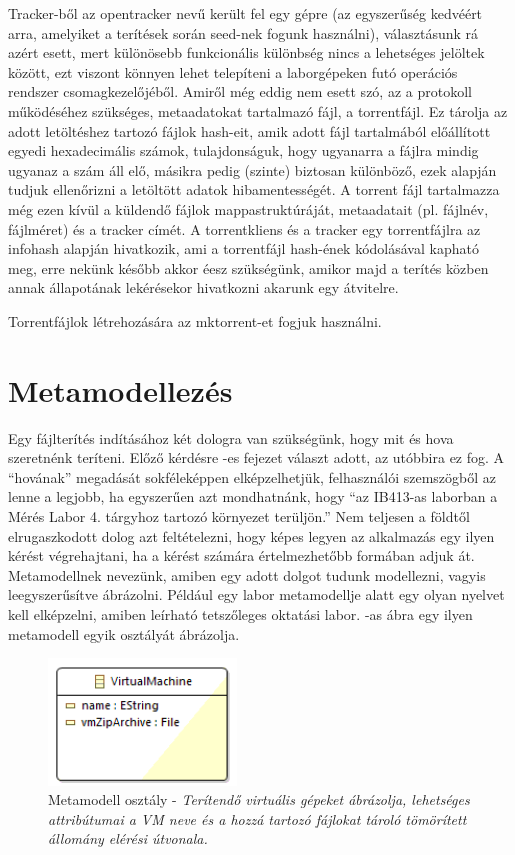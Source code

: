 Tracker-ből az opentracker nevű került fel egy gépre (az egyszerűség kedvéért arra, amelyiket a terítések során seed-nek fogunk használni), választásunk rá azért esett, mert különösebb funkcionális különbség nincs a lehetséges jelöltek között, ezt viszont könnyen lehet telepíteni a laborgépeken futó operációs rendszer csomagkezelőjéből. Amiről még eddig nem esett szó, az a protokoll működéséhez szükséges, metaadatokat tartalmazó fájl, a torrentfájl. Ez tárolja az adott letöltéshez tartozó fájlok hash-eit, amik adott fájl tartalmából előállított egyedi hexadecimális számok, tulajdonságuk, hogy ugyanarra a fájlra mindig ugyanaz a szám áll elő, másikra pedig (szinte) biztosan különböző, ezek alapján tudjuk ellenőrizni a letöltött adatok hibamentességét. A torrent fájl tartalmazza még ezen kívül a küldendő fájlok mappastruktúráját, metaadatait (pl. fájlnév, fájlméret) és a tracker címét. A torrentkliens és a tracker egy torrentfájlra az infohash alapján hivatkozik, ami a torrentfájl hash-ének kódolásával kapható meg, erre nekünk később akkor éesz szükségünk, amikor majd a terítés közben annak állapotának lekérésekor hivatkozni akarunk egy átvitelre.

Torrentfájlok létrehozására az mktorrent-et\cite{mktorrent} fogjuk használni.


\section{Metamodellezés}
Egy fájlterítés indításához két dologra van szükségünk, hogy mit és hova szeretnénk teríteni. Előző kérdésre -es fejezet választ adott, az utóbbira ez fog. A ``hovának'' megadását sokféleképpen elképzelhetjük,  felhasználói szemszögből az lenne a legjobb, ha egyszerűen azt mondhatnánk, hogy ``az IB413-as laborban a Mérés Labor 4. tárgyhoz tartozó környezet terüljön.'' Nem teljesen a földtől elrugaszkodott dolog azt feltételezni, hogy képes legyen az alkalmazás egy ilyen kérést végrehajtani, ha a kérést számára értelmezhetőbb formában adjuk át. 
Metamodellnek nevezünk, amiben egy adott dolgot tudunk modellezni, vagyis leegyszerűsítve ábrázolni. Például egy labor metamodellje alatt egy olyan nyelvet kell elképzelni, amiben leírható tetszőleges oktatási labor. -as ábra egy ilyen metamodell egyik osztályát ábrázolja.

\begin{figure}[ht]
	\centering
	\includegraphics[width=50mm, keepaspectratio]{figures/binf_emf_1.png}
	\caption{Metamodell osztály - \textit{Terítendő virtuális gépeket ábrázolja, lehetséges attribútumai a VM neve és a hozzá tartozó fájlokat tároló tömörített állomány elérési útvonala.}}
	\label{fig:emfobj}
\end{figure}


